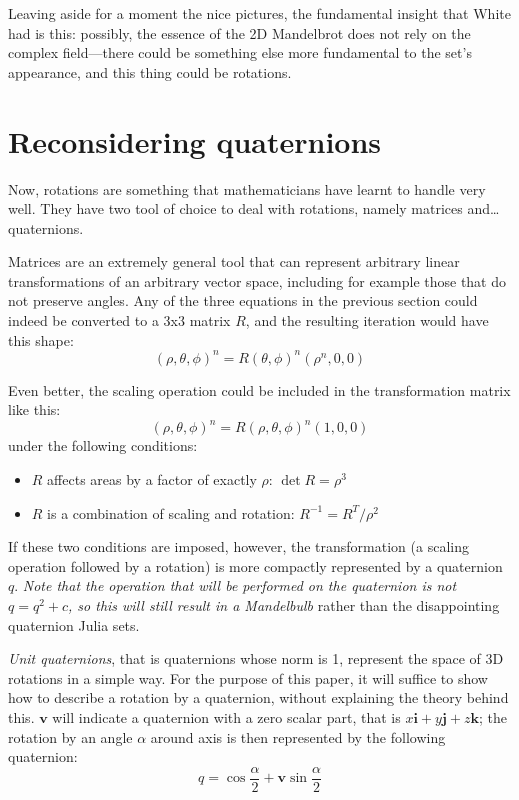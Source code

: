 \documentclass{article}
\let\vec\mathbf
\begin{document}
Leaving aside for a moment the nice pictures, the fundamental insight
that White had is this: possibly, the essence of the 2D Mandelbrot does
not rely on the complex field---there could be something else more
fundamental to the set's appearance, and this thing could be rotations.

\section{Reconsidering quaternions}

Now, rotations are something that mathematicians have learnt to handle
very well.  They have two tool of choice to deal with rotations, namely
matrices and\dots quaternions.

Matrices are an extremely general tool that can represent arbitrary
linear transformations of an arbitrary vector space, including for
example those that do not preserve angles.  Any of the three equations
in the previous section could indeed be converted to a 3x3 matrix $R$,
and the resulting iteration would have this shape:
\begin{equation*}
  (\rho,\theta,\phi)^n = R(\theta,\phi)^n (\rho^n,0,0)
\end{equation*}

\noindent
Even better, the scaling operation could be included in the transformation
matrix like this:
\begin{equation*}
  (\rho,\theta,\phi)^n = R(\rho,\theta,\phi)^n (1,0,0)
\end{equation*}
\noindent
under the following conditions:
\begin{itemize}
\item $R$ affects areas by a factor of exactly $\rho$: $\det R = \rho^3$
\item $R$ is a combination of scaling and rotation: $R^{-1} = R^T / \rho^2$
\end{itemize}

If these two conditions are imposed, however, the transformation (a
scaling operation followed by a rotation) is more compactly
represented by a quaternion $q$.  \emph{Note that the operation that
  will be performed on the quaternion is \emph{not} $q=q^2+c$, so this
  will still result in a Mandelbulb} rather than the disappointing
quaternion Julia sets.

\emph{Unit quaternions}, that is quaternions whose norm is 1, represent
the space of 3D rotations in a simple way.  For the purpose of this paper,
it will suffice to show how to describe a rotation by a quaternion,
without explaining the theory behind this.  $\vec{v}$ will indicate a
quaternion with a zero scalar part, that is $x\vec{i}+y\vec{j}+z\vec{k}$;
the rotation by an angle $\alpha$ around axis is then represented by the
following quaternion:
\begin{equation*}
q = \cos \frac\alpha2 + \vec{v} \sin \frac\alpha2
\end{equation*}
\end{document}
